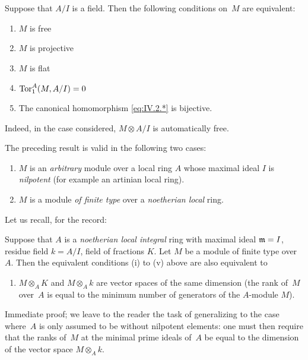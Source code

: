 \begin{corollary}
\label{IV.4.3}
Suppose that $A/I$ is a field. Then the following conditions on~$M$
are equivalent:
\begin{enumerate}
\item[(i)] $M$ is free
\item[(ii)] $M$ is projective
\item[(iii)] $M$ is flat
\item[(iv)] $\operatorname{Tor}_1^A(M, A/I) = 0$
\item[(v)] The canonical homomorphism \eqref{eq:IV.2.*} is bijective.
\end{enumerate}
\end{corollary}

Indeed, in the case considered, $M \otimes A/I$ is automatically
free.

The preceding result is valid in the following two cases:
\begin{enumerate}
\item[(a)] $M$ is an \emph{arbitrary} module over a local ring $A$
whose maximal ideal $I$ is \emph{nilpotent} (for example an artinian
local ring).
\item[(b)] $M$ is a module \emph{of finite type} over a
\emph{noetherian local} ring.
\end{enumerate}

Let us recall,
for the record:
\begin{corollary}
\label{IV.4.4}
Suppose that $A$ is a \emph{noetherian local integral} ring with
maximal ideal $\mathfrak{m} = I$, residue field $k = A/I$, field of
fractions $K$. Let $M$ be a module of finite type over~$A$. Then the
equivalent conditions \textup{(i)} to \textup{(v)} above are also
equivalent to
\begin{enumerate}
\item[(vi)] $M \otimes_A K$ and $M \otimes_A k$ are vector spaces of
the same dimension (\ie the rank of~$M$ over~$A$ is equal to the
minimum number of generators of the $A$-module $M$).
\end{enumerate}
\end{corollary}

Immediate proof; we leave to the reader the task of generalizing to
the case where~$A$ is only assumed to be without nilpotent elements:
one must then require that the ranks of~$M$ at the minimal prime
ideals of~$A$ be equal to the dimension of the vector space $M
\otimes_A k$.
